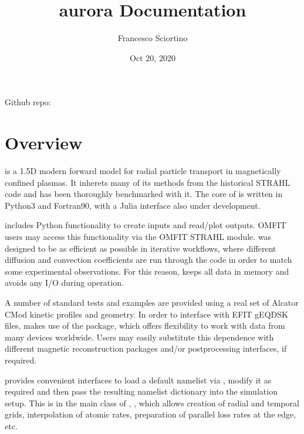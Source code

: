 \documentclass[letterpaper,10pt,english]{sphinxmanual}
\title{aurora Documentation}
\date{Oct 20, 2020}
\author{Francesco Sciortino}
\begin{document}
\pagestyle{empty}
\sphinxmaketitle
\pagestyle{plain}
\sphinxtableofcontents
\pagestyle{normal}
\label{\detokenize{index::doc}}


Github repo: 


\chapter{Overview}
\label{\detokenize{index:overview}}
{\hyperref[\detokenize{aurora:module-aurora}]{}} is a 1.5D modern forward model for radial particle transport in magnetically confined plasmas. It inherets many of its methods from the historical STRAHL code and has been thoroughly benchmarked with it. The core of {\hyperref[\detokenize{aurora:module-aurora}]{}} is written in Python3 and Fortran90, with a Julia interface also under development.

{\hyperref[\detokenize{aurora:module-aurora}]{}} includes Python functionality to create inputs and read/plot outputs. OMFIT users may access this functionality via the OMFIT STRAHL module. {\hyperref[\detokenize{aurora:module-aurora}]{}} was designed to be as efficient as possible in iterative workflows, where different diffusion and convection coefficients are run through the code in order to match some experimental observations. For this reason, {\hyperref[\detokenize{aurora:module-aurora}]{}} keeps all data in memory and avoids any I/O during operation.

A number of standard tests and examples are provided using a real set of Alcator C\sphinxhyphen{}Mod kinetic profiles and geometry. In order to interface with EFIT gEQDSK files, {\hyperref[\detokenize{aurora:module-aurora}]{}} makes use of the  package, which offers flexibility to work with data from many devices worldwide. Users may easily substitute this dependence with different magnetic reconstruction packages and/or postprocessing interfaces, if required.

{\hyperref[\detokenize{aurora:module-aurora}]{}} provides convenient interfaces to load a default namelist via {\hyperref[\detokenize{aurora:module-aurora.default_nml}]{}}, modify it as required and then pass the resulting namelist dictionary into the simulation setup. This is in the main class of {\hyperref[\detokenize{aurora:module-aurora}]{}}, {\hyperref[\detokenize{aurora:aurora.core.aurora_sim}]{}}, which allows creation of radial and temporal grids, interpolation of atomic rates, preparation of parallel loss rates at the edge, etc.
\end{document}
